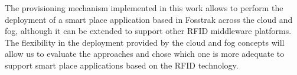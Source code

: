 The provisioning mechanism implemented in this work allows to perform the deployment of a smart place
application based in Fosstrak across the cloud and fog, although it can be extended to support other
\gls{RFID} middleware platforms. The flexibility in the deployment provided by the cloud and fog
concepts will allow us to evaluate the approaches and chose which one is more adequate to support smart
place applications based on the \gls{RFID} technology.
